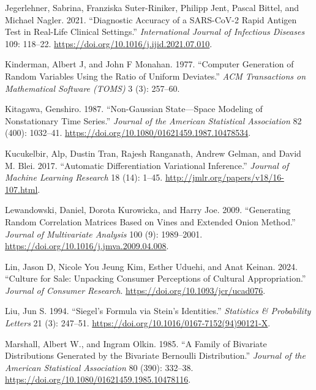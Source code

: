 \documentclass[
  11pt,
  letterpaper,
]{scrbook}
\newlength{\cslhangindent}
\newenvironment{CSLReferences}[2] %
 {\begin{list}{}{%
  \setlength{\itemindent}{0pt}
  \setlength{\leftmargin}{0pt}
  \setlength{\parsep}{0pt}
  \ifodd #1
   \setlength{\leftmargin}{\cslhangindent}
   \setlength{\itemindent}{-1\cslhangindent}
  \fi
  \setlength{\itemsep}{#2\baselineskip}}}
 {\end{list}}
\theoremstyle{plain}
\theoremstyle{plain}
\theoremstyle{definition}
\theoremstyle{definition}
\theoremstyle{definition}
\theoremstyle{plain}
\theoremstyle{remark}
\begin{document}
\begin{CSLReferences}{1}{0}
Jegerlehner, Sabrina, Franziska Suter-Riniker, Philipp Jent, Pascal
Bittel, and Michael Nagler. 2021. {``Diagnostic Accuracy of a
{SARS-CoV-2} Rapid Antigen Test in Real-Life Clinical Settings.''}
\emph{International Journal of Infectious Diseases} 109: 118--22.
\url{https://doi.org/10.1016/j.ijid.2021.07.010}.

Kinderman, Albert J, and John F Monahan. 1977. {``Computer Generation of
Random Variables Using the Ratio of Uniform Deviates.''} \emph{ACM
Transactions on Mathematical Software (TOMS)} 3 (3): 257--60.

Kitagawa, Genshiro. 1987. {``Non-{G}aussian State---Space Modeling of
Nonstationary Time Series.''} \emph{Journal of the American Statistical
Association} 82 (400): 1032--41.
\url{https://doi.org/10.1080/01621459.1987.10478534}.

Kucukelbir, Alp, Dustin Tran, Rajesh Ranganath, Andrew Gelman, and David
M. Blei. 2017. {``Automatic Differentiation Variational Inference.''}
\emph{Journal of Machine Learning Research} 18 (14): 1--45.
\url{http://jmlr.org/papers/v18/16-107.html}.

Lewandowski, Daniel, Dorota Kurowicka, and Harry Joe. 2009.
{``Generating Random Correlation Matrices Based on Vines and Extended
Onion Method.''} \emph{Journal of Multivariate Analysis} 100 (9):
1989--2001. \url{https://doi.org/10.1016/j.jmva.2009.04.008}.

Lin, Jason D, Nicole You Jeung Kim, Esther Uduehi, and Anat Keinan.
2024. {``Culture for Sale: Unpacking Consumer Perceptions of Cultural
Appropriation.''} \emph{Journal of Consumer Research}.
\url{https://doi.org/10.1093/jcr/ucad076}.

Liu, Jun S. 1994. {``{S}iegel's Formula via {S}tein's Identities.''}
\emph{Statistics \& Probability Letters} 21 (3): 247--51.
\url{https://doi.org/10.1016/0167-7152(94)90121-X}.

Marshall, Albert W., and Ingram Olkin. 1985. {``A Family of Bivariate
Distributions Generated by the Bivariate {B}ernoulli Distribution.''}
\emph{Journal of the American Statistical Association} 80 (390):
332--38. \url{https://doi.org/10.1080/01621459.1985.10478116}.


\end{CSLReferences}
\end{document}
